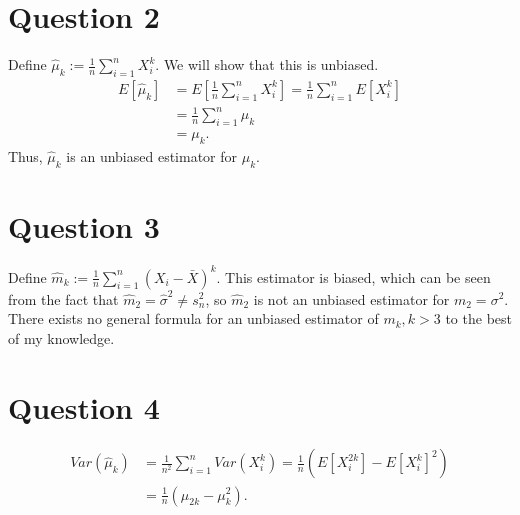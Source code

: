 \documentclass[11pt]{article} %
\begin{document}
\section{Question 2}
Define $\hat{\mu}_k:= \frac{1}{n}\sum_{i=1}^{n}X_i^k.$ We will show that this is unbiased.
\begin{align*}
E[\hat{\mu}_k] &= E\left[\frac{1}{n}\sum_{i=1}^{n}X_i^k\right] = \frac{1}{n}\sum_{i=1}^nE[X_i^k]\\
 &=\frac{1}{n}\sum_{i=1}^n\mu_k \\
&= \mu_k.
\end{align*}
Thus, $\hat{\mu}_k$ is an unbiased estimator for $\mu_k$.
\section{Question 3}
Define $\hat{m}_k:= \frac{1}{n}\sum_{i=1}^n (X_i - \bar{X})^k$. This estimator is biased, which can be seen from the fact that $\hat{m}_2 = \hat{\sigma}^2 \neq s_{n}^2$, so $\hat{m}_2$ is not an unbiased estimator for $m_2 = \sigma^2$. There exists no general formula for an unbiased estimator of $m_k,k>3$ to the best of my knowledge.
\section{Question 4}
\begin{align*}
Var(\hat{\mu}_k) &= \frac{1}{n^2}\sum_{i=1}^n Var(X_i^k) = \frac{1}{n}(E[X_i^{2k}] - E[X_i^k]^2)\\
&= \frac{1}{n}(\mu_{2k} - \mu_k^2).
\end{align*}
\end{document}
